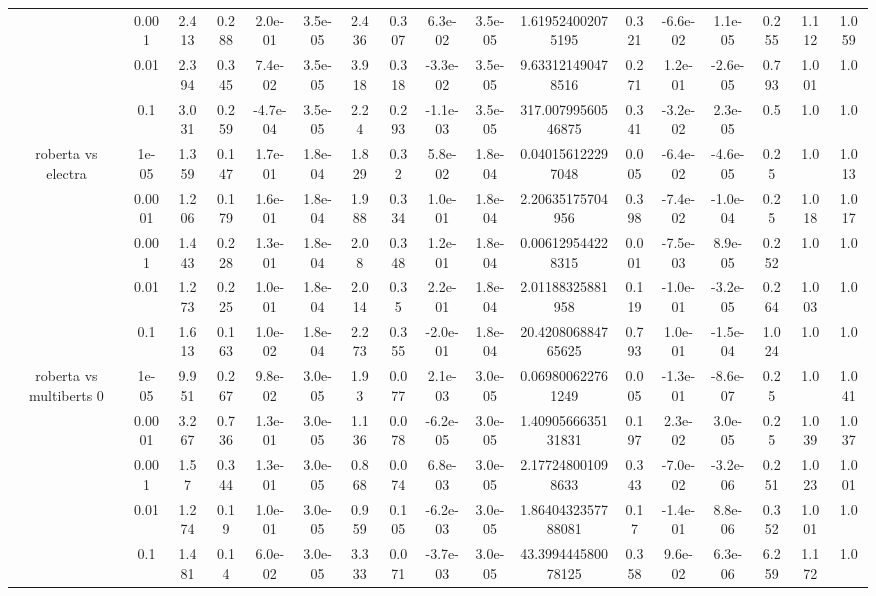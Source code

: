\begin{tabular}{|c|c|c|c|c|c|c|c|c|c|c|c|c|c|c|c|c|}
 & 0.001 & 2.413 & 0.288 & 2.0e-01 & 3.5e-05 & 2.436 & 0.307 & 6.3e-02 & 3.5e-05 & 1.619524002075195 & 0.321 & -6.6e-02 & 1.1e-05 & 0.255 & 1.112 & 1.059 \\
 & 0.01 & 2.394 & 0.345 & 7.4e-02 & 3.5e-05 & 3.918 & 0.318 & -3.3e-02 & 3.5e-05 & 9.633121490478516 & 0.271 & 1.2e-01 & -2.6e-05 & 0.793 & 1.001 & 1.0 \\
 & 0.1 & 3.031 & 0.259 & -4.7e-04 & 3.5e-05 & 2.24 & 0.293 & -1.1e-03 & 3.5e-05 & 317.00799560546875 & 0.341 & -3.2e-02 & 2.3e-05 & 0.5 & 1.0 & 1.0 \\
\hline
\multirow{5}{*}{roberta  vs electra } & 1e-05 & 1.359 & 0.147 & 1.7e-01 & 1.8e-04 & 1.829 & 0.32 & 5.8e-02 & 1.8e-04 & 0.040156122297048 & 0.005 & -6.4e-02 & -4.6e-05 & 0.25 & 1.0 & 1.013 \\
 & 0.0001 & 1.206 & 0.179 & 1.6e-01 & 1.8e-04 & 1.988 & 0.334 & 1.0e-01 & 1.8e-04 & 2.20635175704956 & 0.398 & -7.4e-02 & -1.0e-04 & 0.25 & 1.018 & 1.017 \\
 & 0.001 & 1.443 & 0.228 & 1.3e-01 & 1.8e-04 & 2.08 & 0.348 & 1.2e-01 & 1.8e-04 & 0.006129544228315 & 0.001 & -7.5e-03 & 8.9e-05 & 0.252 & 1.0 & 1.0 \\
 & 0.01 & 1.273 & 0.225 & 1.0e-01 & 1.8e-04 & 2.014 & 0.35 & 2.2e-01 & 1.8e-04 & 2.01188325881958 & 0.119 & -1.0e-01 & -3.2e-05 & 0.264 & 1.003 & 1.0 \\
 & 0.1 & 1.613 & 0.163 & 1.0e-02 & 1.8e-04 & 2.273 & 0.355 & -2.0e-01 & 1.8e-04 & 20.420806884765625 & 0.793 & 1.0e-01 & -1.5e-04 & 1.024 & 1.0 & 1.0 \\
\hline
\multirow{5}{*}{roberta  vs multiberts 0} & 1e-05 & 9.951 & 0.267 & 9.8e-02 & 3.0e-05 & 1.93 & 0.077 & 2.1e-03 & 3.0e-05 & 0.069800622761249 & 0.005 & -1.3e-01 & -8.6e-07 & 0.25 & 1.0 & 1.041 \\
 & 0.0001 & 3.267 & 0.736 & 1.3e-01 & 3.0e-05 & 1.136 & 0.078 & -6.2e-05 & 3.0e-05 & 1.4090566635131831 & 0.197 & 2.3e-02 & 3.0e-05 & 0.25 & 1.039 & 1.037 \\
 & 0.001 & 1.57 & 0.344 & 1.3e-01 & 3.0e-05 & 0.868 & 0.074 & 6.8e-03 & 3.0e-05 & 2.177248001098633 & 0.343 & -7.0e-02 & -3.2e-06 & 0.251 & 1.023 & 1.001 \\
 & 0.01 & 1.274 & 0.19 & 1.0e-01 & 3.0e-05 & 0.959 & 0.105 & -6.2e-03 & 3.0e-05 & 1.8640432357788081 & 0.17 & -1.4e-01 & 8.8e-06 & 0.352 & 1.001 & 1.0 \\
 & 0.1 & 1.481 & 0.14 & 6.0e-02 & 3.0e-05 & 3.333 & 0.071 & -3.7e-03 & 3.0e-05 & 43.399444580078125 & 0.358 & 9.6e-02 & 6.3e-06 & 6.259 & 1.172 & 1.0 \\

\end{tabular}
